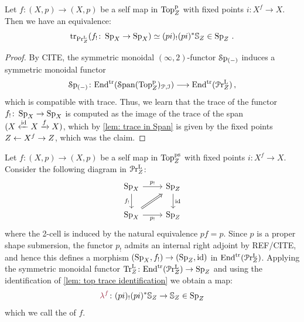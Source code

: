 \begin{lem}\label{lem: top trace identification}
    Let $f\colon (X,p)\to (X,p)$ be a self map in $\mathrm{Top}^{\mathrm{p}}_{Z}$ with
    fixed points $i\colon X^f\to X$. Then we
    have an equivalence:
    \[ \mathrm{tr}_{\mathrm{Pr}^{\mathrm{L}}_{Z}} (f_!\colon \operatorname{Sp}_{X}\to \operatorname{Sp}_{X})\simeq (pi)_!(pi)^{\ast}\mathbb{S}_{Z}\in \operatorname{Sp}_{Z}\,.\]
\end{lem}
\begin{proof}
  By CITE, the symmetric monoidal $(\infty,2)$-functor 
  $\mathcal{S}\mathrm{p}_{(-)}$ induces a symmetric monoidal functor 
  \[ \mathcal{S}\mathrm{p}_{(-)}\colon \mathrm{End}^{\mathrm{tr}}(\operatorname{\mathcal S\mathrm{pan}}({\mathrm{Top}^{\mathrm{p}}_{Z}})_{\mathcal{P},\mathcal{I}}) 
  \longrightarrow \mathrm{End}^{\mathrm{tr}}(\mathcal{P}\mathrm{r}^{\mathrm{L}}_{Z})\,,\]
  which is compatible with trace. Thus, we learn that 
 the trace of the functor $f_!\colon \operatorname{Sp}_{X}\to \operatorname{Sp}_{X}$
 is computed as the image of the trace of the span 
 $(X\xleftarrow{\operatorname{id}} X \xrightarrow{f}X)$, which by \cref{lem: trace in Span}
 is given by the fixed points $Z \leftarrow X^f \to Z$,
 which was the claim. 
\end{proof}

\begin{cons}\label{cons: Lefschetz index}
    Let $f\colon (X,p)\to (X,p)$ be a self map in $\mathrm{Top}^{\mathrm{ps}}_{Z}$ with
    fixed points $i\colon X^f\to X$. Consider 
    the following diagram in $\mathcal{P}\mathrm{r}^{\mathrm{L}}_{Z}$:
   \[\begin{tikzcd}
	{\D{X}} & {\D{\base}} \\
	{\D{X}} & {\D{\base}}
	\arrow["{p_!}", from=1-1, to=1-2]
	\arrow["{f_!}"', from=1-1, to=2-1]
	\arrow["\id", from=1-2, to=2-2]
	\arrow[Rightarrow, from=2-1, to=1-2]
	\arrow["{p_!}"', from=2-1, to=2-2]
\end{tikzcd} \]
where the 2-cell is induced by the natural equivalence
$pf=p$. Since $p$ is a proper shape submersion,
the functor $p_!$ admits an internal right adjoint by REF/CITE,
and hence this defines a morphism $(\operatorname{Sp}_{X},f_!)\to (\operatorname{Sp}_{Z},\operatorname{id})$ in $\mathrm{End}^{\mathrm{tr}}(\mathcal{P}\mathrm{r}^{\mathrm{L}}_{Z})$. Applying the symmetric
monoidal functor $\mathrm{Tr}^{\mathrm{L}}_{Z}\colon \mathrm{End}^{\mathrm{tr}}(\mathcal{P}\mathrm{r}^{\mathrm{L}}_{Z}) \to \operatorname{Sp}_{Z}$ and using the identification of \cref{lem: top trace identification} we obtain
a map:
\[ \mdef{\lambda^f}\colon (pi)_!(pi)^{\ast}\SS_{\base} 
\to \SS_{\base} \in \D{\base}\]
which we call the  of $f$. 
    \end{cons}

